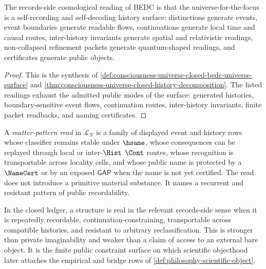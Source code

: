 \begin{corollary}
\label{cor:consciousness-universe-certified-cosmological-reading}
The records-side cosmological reading of BEDC is that the universe-for-the-focus is a self-recording and self-decoding history surface: distinctions generate events, event boundaries generate readable flows, continuations generate local time and causal routes, inter-history invariants generate spatial and relativistic readings, non-collapsed refinement packets generate quantum-shaped readings, and certificates generate public objects.
\end{corollary}

\begin{proof}
This is the synthesis of \autoref{def:consciousness-universe-closed-bedc-universe-surface} and \autoref{thm:consciousness-universe-closed-history-decomposition}. The listed readings exhaust the admitted public modes of the surface: generated histories, boundary-sensitive event flows, continuation routes, inter-history invariants, finite packet readbacks, and naming certificates.
\end{proof}

\begin{definition}
\label{def:consciousness-universe-matter-pattern-read}
A \emph{matter-pattern read} in $\mathcal{L}_N$ is a family of displayed event and history rows whose classifier remains stable under $\hsame$, whose consequences can be replayed through local or inter-$\Hist$ $\Cont$ routes, whose recognition is transportable across locality cells, and whose public name is protected by a $\NameCert$ or by an exposed $\mathsf{GAP}$ when the name is not yet certified. The read does not introduce a primitive material substance. It names a recurrent and resistant pattern of public recordability.
\end{definition}

\begin{principle}
\label{prin:consciousness-universe-reality-as-public-constraint}
In the closed ledger, a structure is real in the relevant records-side sense when it is repeatedly recordable, continuation-constraining, transportable across compatible histories, and resistant to arbitrary reclassification. This is stronger than private imaginability and weaker than a claim of access to an external bare object. It is the finite public constraint surface on which scientific objecthood later attaches the empirical and bridge rows of \autoref{def:philosophy-scientific-object}.
\end{principle}

